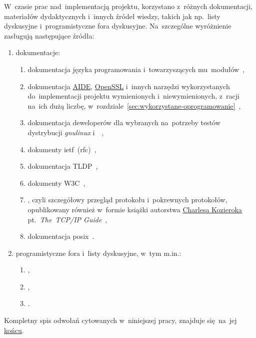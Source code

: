 \documentclass[thesis]{subfiles}
\begin{document}
W~czasie prac nad~implementacją projektu, korzystano z~różnych dokumentacji, materiałów dydaktycznych i~innych źródeł wiedzy, takich jak np.~listy dyskusyjne i~programistyczne fora dyskusyjne. Na~szczególne wyróżnienie zasługują następujące źródła:\mynobreakpar
\begin{enumerate}
	\item dokumentacje:\mynobreakpar
	\begin{enumerate}
		\item dokumentacja języka programowania \python{} i~towarzyszących mu~modułów~\cite{python-doc},%
		\item dokumentacja \hyperref[sec:aide]{AIDE}, \href{https://en.wikipedia.org/wiki/OpenSSL}{OpenSSL} i~innych narzędzi wykorzystanych do~implementacji projektu wymienionych i~niewymienionych, z~racji na~ich dużą liczbę, w~rozdziale~\ref{sec:wykorzystane-oprogramowanie}~\cite{openssl-doc},
		\item dokumentacja deweloperów dla wybranych na~potrzeby testów dystrybucji \emph{\gls{gnulinux}}  i~~\cite{archlinux-wiki,debian-wiki},
		\item dokumenty \gls{ietf}~(\gls{rfc})~\cite{rfc-editor},
		\item dokumentacja TLDP~\cite{tldp},
		\item dokumenty W3C~\cite{w3c},
		\item {}, czyli szczegółowy przegląd protokołu  i~pokrewnych protokołów, opublikowany również w~formie książki autorstwa \href{https://www.linkedin.com/in/charles-kozierok-708112/}{\mbox{Charlesa} \mbox{Kozieroka}} pt.~\emph{The~TCP/IP Guide}~\cite{tcpguide-book},
		\item dokumentacja \gls{posix}~\cite{posix}.
	\end{enumerate}
	\item programistyczne fora i~listy dyskusyjne, w~tym m.in.:\mynobreakpar
	\begin{enumerate}
		\item {},
		\item {},
		\item {}.
	\end{enumerate}
\end{enumerate}
Kompletny spis odwołań cytowanych w~niniejszej pracy, znajduje się~na~jej \hyperref[bibliography-page]{końcu}. %
\end{document}
